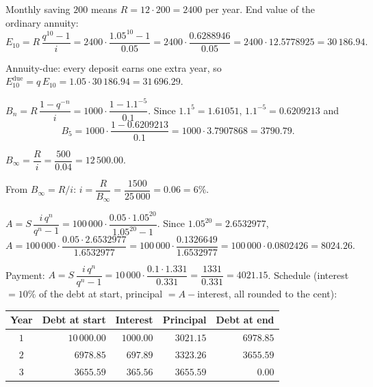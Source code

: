 \begin{solutions}
  \item Monthly saving $200$ means $R=12\cdot 200=2400$ per year. End
        value of the ordinary annuity:
        \[
          E_{10}=R\,\frac{q^{10}-1}{i}
                =2400\cdot\frac{1.05^{10}-1}{0.05}
                =2400\cdot\frac{0.6288946}{0.05}
                =2400\cdot 12.5778925=30\,186.94 .
        \]

  \item Annuity-due: every deposit earns one extra year, so
        $E_{10}^{\mathrm{due}}=q\,E_{10}
        =1.05\cdot 30\,186.94=31\,696.29$.

  \item $B_{n}=R\,\dfrac{1-q^{-n}}{i}
        =1000\cdot\dfrac{1-1.1^{-5}}{0.1}$. Since $1.1^{5}=1.61051$,
        $1.1^{-5}=0.6209213$ and
        \[
          B_{5}=1000\cdot\frac{1-0.6209213}{0.1}
               =1000\cdot 3.7907868=3790.79 .
        \]

  \item $B_{\infty}=\dfrac{R}{i}=\dfrac{500}{0.04}=12\,500.00$.

  \item From $B_{\infty}=R/i$: $i=\dfrac{R}{B_{\infty}}
        =\dfrac{1500}{25\,000}=0.06=6\%$.

  \item $A=S\,\dfrac{i\,q^{n}}{q^{n}-1}
        =100\,000\cdot\dfrac{0.05\cdot 1.05^{20}}{1.05^{20}-1}$. Since
        $1.05^{20}=2.6532977$,
        \[
          A=100\,000\cdot\frac{0.05\cdot 2.6532977}{1.6532977}
           =100\,000\cdot\frac{0.1326649}{1.6532977}
           =100\,000\cdot 0.0802426=8024.26 .
        \]

  \item Payment: $A=S\,\dfrac{i\,q^{n}}{q^{n}-1}
        =10\,000\cdot\dfrac{0.1\cdot 1.331}{0.331}
        =\dfrac{1331}{0.331}=4021.15$. Schedule (interest $=10\%$ of the
        debt at start, principal $=A-{}$interest, all rounded to the
        cent):

        \begin{center}
        \begin{tabular}{c r r r r}
        \hline
        Year & Debt at start & Interest & Principal & Debt at end\\
        \hline
        $1$ & $10\,000.00$ & $1000.00$ & $3021.15$ & $6978.85$\\
        $2$ & $6978.85$ & $697.89$ & $3323.26$ & $3655.59$\\
        $3$ & $3655.59$ & $365.56$ & $3655.59$ & $0.00$\\
        \hline
        \end{tabular}
        \end{center}


\end{solutions}
